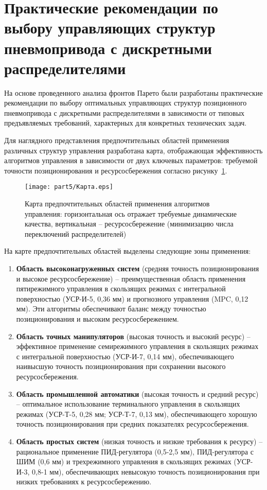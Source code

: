 \section{Практические рекомендации по выбору управляющих структур пневмопривода с дискретными распределителями}

На основе проведенного анализа фронтов Парето были разработаны практические рекомендации
по выбору оптимальных управляющих структур позиционного пневмопривода с дискретными
распределителями в зависимости от типовых предъявляемых требований,
характерных для  конкретных технических задач.

Для наглядного представления предпочтительных областей применения различных
структур управления разработана карта, отображающая эффективность алгоритмов
управления в зависимости от двух ключевых параметров: требуемой точности
позиционирования и ресурсосбережения согласно рисунку~\ref{fig:algorithm_map}.

\begin{figure}[ht]
	\centering
	\texttt{[image: part5/Карта.eps]}
	\caption{Карта предпочтительных областей применения алгоритмов управления:
		горизонтальная ось отражает требуемые динамические качества, вертикальная
		-- ресурсосбережение (минимизацию числа переключений распределителей)}
	\label{fig:algorithm_map}
\end{figure}

На карте предпочтительных областей выделены следующие зоны применения:

\begin{enumerate}
	\item \textbf{Область высоконагруженных систем} (средняя точность позиционирования и
	      высокое ресурсосбережение) -- преимущественная область применения пятирежимного управления
	      в скользящих режимах с интегральной поверхностью (УСР-И-5, 0,36 мм) и прогнозного
	      управления (MPC, 0,12 мм). Эти алгоритмы обеспечивают баланс между точностью
	      позиционирования и высоким ресурсосбережением.

	\item \textbf{Область точных манипуляторов} (высокая точность и высокий ресурс) -- эффективное
	      применение семирежимного управления в скользящих режимах с интегральной поверхностью
	      (УСР-И-7, 0,14 мм), обеспечивающего наивысшую точность позиционирования при сохранении
	      высокого ресурсосбережения.

	\item \textbf{Область промышленной автоматики} (высокая точность и средний ресурс) -- оптимальное
	      использование терминального управления в скользящих режимах (УСР-Т-5, 0,28 мм; УСР-Т-7, 0,13 мм),
	      обеспечивающего хорошую точность позиционирования при средних показателях ресурсосбережения.

	\item \textbf{Область простых систем} (низкая точность и низкие требования к ресурсу) -- рациональное
	      применение ПИД-регулятора (0,5-2,5 мм), ПИД-регулятора с ШИМ (0,6 мм) и трехрежимного управления
	      в скользящих режимах (УСР-И-3, 0,8-1 мм), обеспечивающих невысокую точность позиционирования при
	      низких требованиях к ресурсосбережению.
\end{enumerate}


